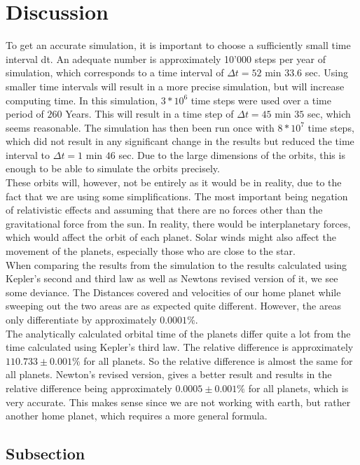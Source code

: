 \documentclass[reprint,english,notitlepage]{revtex4-2}
\begin{document}
\section{Discussion}
To get an accurate simulation, it is important to choose a sufficiently small time interval dt.
An adequate number is approximately 10'000 steps per year of simulation, which corresponds to a time interval of $\Delta t = 52$ min $33.6$ sec.
Using smaller time intervals will result in a more precise simulation, but will increase computing time. In this simulation, $3*10^6$ time steps were used over a time period of $260$ Years.
This will result in a time step of $\Delta t = 45$ min $35$ sec, which seems reasonable.
The simulation has then been run once with $8*10^7$ time steps, which did not result in any significant change in the results but reduced the time interval to $\Delta t = 1$ min $46$ sec.
Due to the large dimensions of the orbits, this is enough to be able to simulate the orbits precisely.\\
These orbits will, however, not be entirely as it would be in reality, due to the fact that we are using some simplifications.
The most important being negation of relativistic effects and assuming that there are no forces other than the gravitational force from the sun.
In reality, there would be interplanetary forces, which would affect the orbit of each planet.
Solar winds might also affect the movement of the planets, especially those who are close to the star.\\
When comparing the results from the simulation to the results calculated using Kepler's second and third law as well as Newtons revised version of it, we see some deviance.
The Distances covered and velocities of our home planet while sweeping out the two areas are as expected quite different.
However, the areas only differentiate by approximately $0.0001\%$.\\

The analytically calculated orbital time of the planets differ quite a lot from the time calculated using Kepler's third law.
The relative difference is approximately $110.733 \pm 0.001\%$ for all planets.
So the relative difference is almost the same for all planets.
Newton's revised version, gives a better result and results in the relative difference being approximately $0.0005 \pm 0.001\%$ for all planets, which is very accurate.
This makes sense since we are not working with earth, but rather another home planet, which requires a more general formula.

	\subsection{Subsection}
\end{document}

